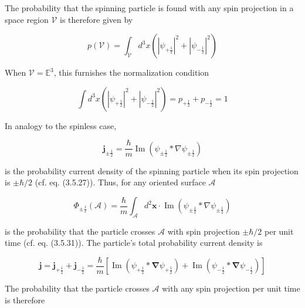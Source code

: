 \documentclass{article}
\begin{document}
The probability that the spinning particle is found with any spin projection in a space region $\mathcal{V}$ is therefore given by
 
\begin{equation*}
p(\mathcal{V})=\int_{\mathcal{V}} d^{3} x\left(\left|\psi_{+\frac{1}{2}}\right|^{2}+\left|\psi_{-\frac{1}{2}}\right|^{2}\right) \tag{3.21.6}
\end{equation*}
 

When $\mathcal{V}=\mathbb{E}^{3}$, this furnishes the normalization condition
 
\begin{equation*}
\int d^{3} x\left(\left|\psi_{+\frac{1}{2}}\right|^{2}+\left|\psi_{-\frac{1}{2}}\right|^{2}\right)=p_{+\frac{1}{2}}+p_{-\frac{1}{2}}=1 \tag{3.21.7}
\end{equation*}
 

In analogy to the spinless case,
 
\begin{equation*}
\boldsymbol{j}_{ \pm \frac{1}{2}}=\frac{\hbar}{m} \operatorname{Im}\left(\psi_{ \pm \frac{1}{2}} * \nabla \psi_{ \pm \frac{1}{2}}\right) \tag{3.21.8}
\end{equation*}
 
is the probability current density of the spinning particle when its spin projection is $\pm \hbar / 2$ (cf. eq. (3.5.27)). Thus, for any oriented surface $\mathcal{A}$
 
\begin{equation*}
\Phi_{ \pm \frac{1}{2}}(\mathcal{A})=\frac{\hbar}{m} \int_{\mathcal{A}} d^{2} \boldsymbol{x} \cdot \operatorname{Im}\left(\psi_{ \pm \frac{1}{2}} * \nabla \psi_{ \pm \frac{1}{2}}\right) \tag{3.21.9}
\end{equation*}
 
is the probability that the particle crosses $\mathcal{A}$ with spin projection $\pm \hbar / 2$ per unit time (cf. eq. (3.5.31)). The particle's total probability current density is
 
\begin{equation*}
\boldsymbol{j}=\boldsymbol{j}_{+\frac{1}{2}}+\boldsymbol{j}_{-\frac{1}{2}}=\frac{\hbar}{m}\left[\operatorname{Im}\left(\psi_{+\frac{1}{2}} * \boldsymbol{\nabla} \psi_{+\frac{1}{2}}\right)+\operatorname{Im}\left(\psi_{-\frac{1}{2}} * \boldsymbol{\nabla} \psi_{-\frac{1}{2}}\right)\right] \tag{3.21.10}
\end{equation*}
 

The probability that the particle crosses $\mathcal{A}$ with any spin projection per unit time is therefore
 
\end{document}
